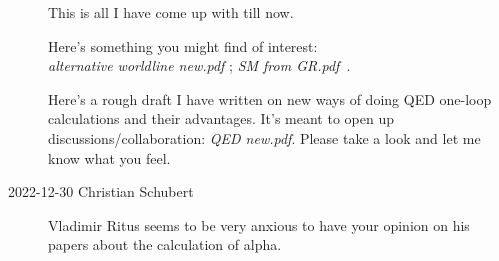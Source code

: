 \begin{description}
This is all I have come up with till now.

Here's something you might find of interest: \\
\emph{alternative worldline new.pdf} ;\;
\emph{SM from GR.pdf} \,.

Here's a rough draft I have written on new ways of doing QED one-loop calculations and their advantages. It's meant to open up discussions/collaboration:
\emph{QED new.pdf}.
Please take a look and let me know what you feel.

\item[2022-12-30 Christian Schubert]
Vladimir Ritus seems to be very anxious to have your opinion on
his papers about the calculation of alpha.

\end{description}
